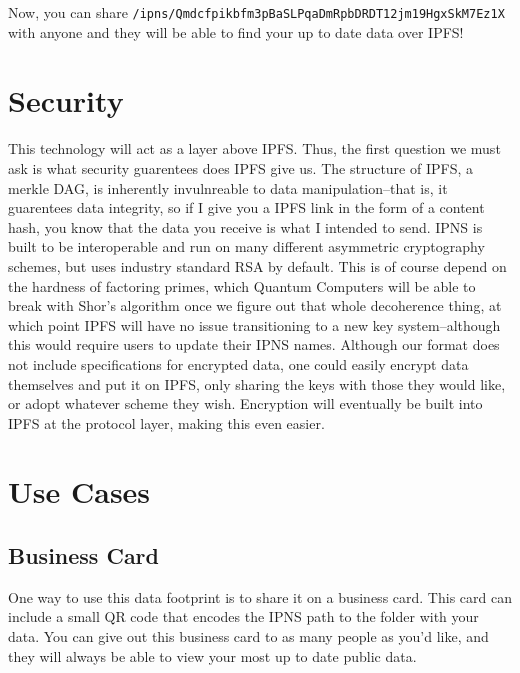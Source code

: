 \documentclass{article}
\begin{document}
Now, you can share \texttt{/ipns/Qmdcfpikbfm3pBaSLPqaDmRpbDRDT12jm19HgxSkM7Ez1X} with anyone and they will be able to find your up to date data over IPFS!

\section{Security}
 
This technology will act as a layer above IPFS. Thus, the first question we must ask is what security guarentees does IPFS give us. The structure of IPFS, a merkle DAG, is inherently invulnreable to data manipulation--that is, it guarentees data integrity, so if I give you a IPFS link in the form of a content hash, you know that the data you receive is what I intended to send. IPNS is built to be interoperable and run on many different asymmetric cryptography schemes, but uses industry standard RSA by default. This is of course depend on the hardness of factoring primes, which Quantum Computers will be able to break with Shor's algorithm once we figure out that whole decoherence thing, at which point IPFS will have no issue transitioning to a new key system--although this would require users to update their IPNS names. Although our format does not include specifications for encrypted data, one could easily encrypt data themselves and put it on IPFS, only sharing the keys with those they would like, or adopt whatever scheme they wish. Encryption will eventually be built into IPFS at the protocol layer, making this even easier. 

\section{Use Cases}

\subsection{Business Card}

One way to use this data footprint is to share it on a business card. This card can include a small QR code that encodes the IPNS path to the folder with your data. You can give out this business card to as many people as you'd like, and they will always be able to view your most up to date public data. 
\end{document}
